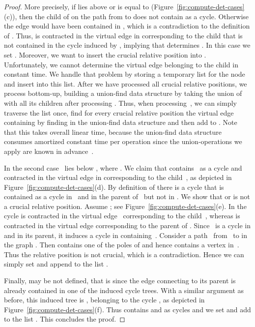 \documentclass{scrartcl}
\newcommand{\1}[1]{{\normalfont \ensuremath{#1^{\tiny\circled{1}}}}} \newcommand{\2}[1]{{\normalfont \ensuremath{#1^{\tiny\circled{2}}}}} \renewcommand{\k}[1]{{\normalfont \ensuremath{#1^{\tiny\circled{k}}}}} \newcommand{\proj}[2]{\ensuremath{\left.#1\right|_{#2}}} \newcommand{\eps}{\varepsilon}
\theoremstyle{plain} \newtheorem{theorem}{Theorem} \newcounter{lemmacounter} \setcounter{lemmacounter}{0} \newtheorem{lemma}[lemmacounter]{Lemma} \newtheorem{fact}{Fact}  \newtheorem{corollary}{Corollary} \theoremstyle{definition} \newtheorem{definition}{Definition}
\begin{document}
\begin{proof}
  More precisely, if  lies above or is equal to 
  (Figure~\ref{fig:compute-det-cases}(c)), then the child  of
   on the path from  to  does not contain  as a
  cycle.  Otherwise the edge  would have been
  contained in , which is a contradiction to the
  definition of .  Thus,  is contracted in the
  virtual edge  in  corresponding to the child
   that is not contained in the cycle induced by , implying
  that  determines .  In this case we set
  .  Moreover, we want to insert the crucial
  relative position  into .  Unfortunately,
  we cannot determine the virtual edge  belonging to the child
   in constant time.  We handle that problem by storing a
  temporary list  for the node  and insert
   into this list.  After we have processed all crucial
  relative positions, we process  bottom-up, building a
  union-find data structure by taking the union of  with all its
  children after processing .  Thus, when processing~, we
  can simply traverse the list  once, find for every
  crucial relative position  the virtual edge 
  containing  by finding  in the
  union-find data structure and then add  to
  .  Note that this takes overall linear time, because
  the union-find data structure consumes amortized constant time per
  operation since the union-operations we apply are known in
  advance~\cite{gt-ltascdsu-85}.

  In the second case~ lies below , where .  We claim that  contains~ as a cycle and
   contracted in the virtual edge  in 
  corresponding to the child~, as depicted in
  Figure~\ref{fig:compute-det-cases}(d).  By definition of
   there is a cycle  that is contained as a cycle
  in~ and in the parent of~ but not in .  We show
  that  or  is not a crucial relative position.
  Assume ; see Figure~\ref{fig:compute-det-cases}(e).  In
   the cycle  is contracted in the virtual
  edge~ corresponding to the child~, whereas  is
  contracted in the virtual edge  corresponding to the parent of
  .  Since~ is a cycle in  and in its parent, it
  induces a cycle in  containing~.  Consider a
  path~ from~ to  in the graph .  Then  contains
  one of the poles of  and hence contains a vertex
  in~.  Thus the relative position  is not crucial,
  which is a contradiction.  Hence we can simply set  and append  to the list .

  Finally,  may be not defined, that is  since the edge connecting  to its parent is already
  contained in one of the induced cycle trees.  With a similar
  argument as before, this induced tree is ,
  belonging to the cycle , as depicted in
  Figure~\ref{fig:compute-det-cases}(f).  Thus  contains  and
   as cycles and we set  and add
   to the list . This concludes the proof.
\end{proof}
\end{document}
